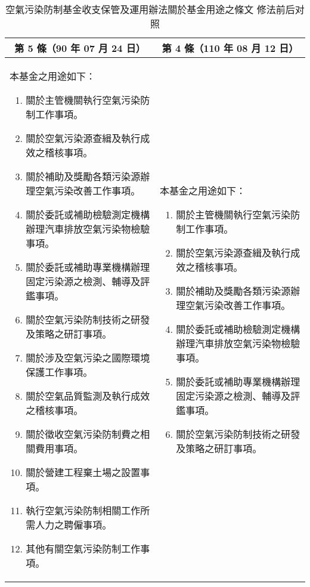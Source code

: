 \documentclass[12pt,a4paper]{article}
\begin{document}
\begin{table}[htbp]
  \centering
  \caption{空氣污染防制基金收支保管及運用辦法關於基金用途之條文 修法前后对照}
  \hspace{12pt}%
  \begin{tabular}{|p{7.5cm}|p{7.5cm}|}
  \hline
  \multicolumn{1}{|c|}{第 5 條（90 年 07 月 24 日）} & \multicolumn{1}{c|}{第 4 條（110 年 08 月 12 日）} \\
  \hline
  本基金之用途如下：
    \begin{enumerate}[label=\zhnum*、,topsep=0.5em, partopsep=0pt, itemsep=0pt, parsep=0pt,leftmargin=3em]
  \item  關於主管機關執行空氣污染防制工作事項。
  \item  關於空氣污染源查緝及執行成效之稽核事項。
  \item  關於補助及獎勵各類污染源辦理空氣污染改善工作事項。
  \item  關於委託或補助檢驗測定機構辦理汽車排放空氣污染物檢驗事項。
  \item  關於委託或補助專業機構辦理固定污染源之檢測、輔導及評鑑事項。
  \item  關於空氣污染防制技術之研發及策略之研訂事項。
  \item  關於涉及空氣污染之國際環境保護工作事項。
  \item  關於空氣品質監測及執行成效之稽核事項。
  \item  關於徵收空氣污染防制費之相關費用事項。
  \item  關於營建工程棄土場之設置事項。
  \item  執行空氣污染防制相關工作所需人力之聘僱事項。
  \item  其他有關空氣污染防制工作事項。
  \end{enumerate}  
  & 
  本基金之用途如下：
  \begin{enumerate}[label=\zhnum*、,topsep=0.5em, partopsep=0pt, itemsep=0pt, parsep=0pt,leftmargin=3em]
  \item  關於主管機關執行空氣污染防制工作事項。
  \item  關於空氣污染源查緝及執行成效之稽核事項。
  \item  關於補助及獎勵各類污染源辦理空氣污染改善工作事項。
  \item  關於委託或補助檢驗測定機構辦理汽車排放空氣污染物檢驗事項。
  \item  關於委託或補助專業機構辦理固定污染源之檢測、輔導及評鑑事項。
  \item  關於空氣污染防制技術之研發及策略之研訂事項。

\end{enumerate}
\end{tabular}
\end{table}
\end{document}
